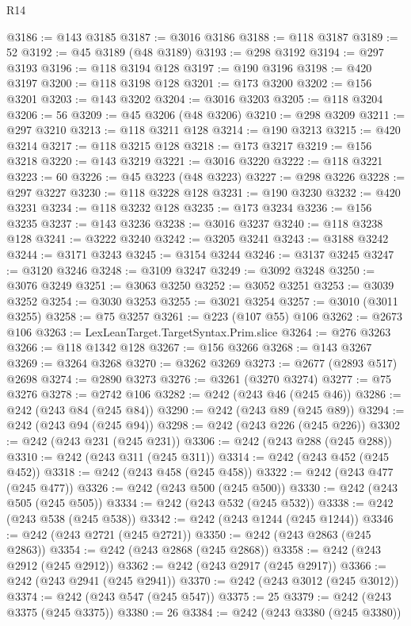 \begin{lexlean}{R14}
\begin{coremodule}
@3186 := @143 @3185
@3187 := @3016 @3186
@3188 := @118 @3187
@3189 := 52
@3192 := @45 @3189 (@48 @3189)
@3193 := @298 @3192
@3194 := @297 @3193
@3196 := @118 @3194 @128
@3197 := @190 @3196
@3198 := @420 @3197
@3200 := @118 @3198 @128
@3201 := @173 @3200
@3202 := @156 @3201
@3203 := @143 @3202
@3204 := @3016 @3203
@3205 := @118 @3204
@3206 := 56
@3209 := @45 @3206 (@48 @3206)
@3210 := @298 @3209
@3211 := @297 @3210
@3213 := @118 @3211 @128
@3214 := @190 @3213
@3215 := @420 @3214
@3217 := @118 @3215 @128
@3218 := @173 @3217
@3219 := @156 @3218
@3220 := @143 @3219
@3221 := @3016 @3220
@3222 := @118 @3221
@3223 := 60
@3226 := @45 @3223 (@48 @3223)
@3227 := @298 @3226
@3228 := @297 @3227
@3230 := @118 @3228 @128
@3231 := @190 @3230
@3232 := @420 @3231
@3234 := @118 @3232 @128
@3235 := @173 @3234
@3236 := @156 @3235
@3237 := @143 @3236
@3238 := @3016 @3237
@3240 := @118 @3238 @128
@3241 := @3222 @3240
@3242 := @3205 @3241
@3243 := @3188 @3242
@3244 := @3171 @3243
@3245 := @3154 @3244
@3246 := @3137 @3245
@3247 := @3120 @3246
@3248 := @3109 @3247
@3249 := @3092 @3248
@3250 := @3076 @3249
@3251 := @3063 @3250
@3252 := @3052 @3251
@3253 := @3039 @3252
@3254 := @3030 @3253
@3255 := @3021 @3254
@3257 := @3010 (@3011 @3255)
@3258 := @75 @3257
@3261 := @223 (@107 @55) @106
@3262 := @2673 @106
@3263 := LexLeanTarget.TargetSyntax.Prim.slice
@3264 := @276 @3263
@3266 := @118 @1342 @128
@3267 := @156 @3266
@3268 := @143 @3267
@3269 := @3264 @3268
@3270 := @3262 @3269
@3273 := @2677 (@2893 @517) @2698
@3274 := @2890 @3273
@3276 := @3261 (@3270 @3274)
@3277 := @75 @3276
@3278 := @2742 @106
@3282 := @242 (@243 @46 (@245 @46))
@3286 := @242 (@243 @84 (@245 @84))
@3290 := @242 (@243 @89 (@245 @89))
@3294 := @242 (@243 @94 (@245 @94))
@3298 := @242 (@243 @226 (@245 @226))
@3302 := @242 (@243 @231 (@245 @231))
@3306 := @242 (@243 @288 (@245 @288))
@3310 := @242 (@243 @311 (@245 @311))
@3314 := @242 (@243 @452 (@245 @452))
@3318 := @242 (@243 @458 (@245 @458))
@3322 := @242 (@243 @477 (@245 @477))
@3326 := @242 (@243 @500 (@245 @500))
@3330 := @242 (@243 @505 (@245 @505))
@3334 := @242 (@243 @532 (@245 @532))
@3338 := @242 (@243 @538 (@245 @538))
@3342 := @242 (@243 @1244 (@245 @1244))
@3346 := @242 (@243 @2721 (@245 @2721))
@3350 := @242 (@243 @2863 (@245 @2863))
@3354 := @242 (@243 @2868 (@245 @2868))
@3358 := @242 (@243 @2912 (@245 @2912))
@3362 := @242 (@243 @2917 (@245 @2917))
@3366 := @242 (@243 @2941 (@245 @2941))
@3370 := @242 (@243 @3012 (@245 @3012))
@3374 := @242 (@243 @547 (@245 @547))
@3375 := 25
@3379 := @242 (@243 @3375 (@245 @3375))
@3380 := 26
@3384 := @242 (@243 @3380 (@245 @3380))

\end{coremodule}
\end{lexlean}
